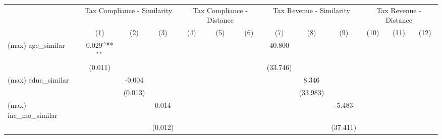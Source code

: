 {
\def\sym#1{\ifmmode^{#1}\else\(^{#1}\)\fi}
\begin{tabular}{l*{12}{c}}
\hline\hline
                &\multicolumn{3}{c}{Tax Compliance - Similarity}         &\multicolumn{3}{c}{Tax Compliance - Distance}           &\multicolumn{3}{c}{Tax Revenue - Similarity}            &\multicolumn{3}{c}{Tax Revenue - Distance}              \\
                &\multicolumn{1}{c}{(1)}         &\multicolumn{1}{c}{(2)}         &\multicolumn{1}{c}{(3)}         &\multicolumn{1}{c}{(4)}         &\multicolumn{1}{c}{(5)}         &\multicolumn{1}{c}{(6)}         &\multicolumn{1}{c}{(7)}         &\multicolumn{1}{c}{(8)}         &\multicolumn{1}{c}{(9)}         &\multicolumn{1}{c}{(10)}         &\multicolumn{1}{c}{(11)}         &\multicolumn{1}{c}{(12)}         \\
\hline
(max) age\_similar&    0.029\sym{**} &                  &                  &                  &                  &                  &   40.800         &                  &                  &                  &                  &                  \\
                &  (0.011)         &                  &                  &                  &                  &                  & (33.746)         &                  &                  &                  &                  &                  \\
(max) educ\_similar&                  &   -0.004         &                  &                  &                  &                  &                  &    8.346         &                  &                  &                  &                  \\
                &                  &  (0.013)         &                  &                  &                  &                  &                  & (33.983)         &                  &                  &                  &                  \\
(max) inc\_mo\_similar&                  &                  &    0.014         &                  &                  &                  &                  &                  &   -5.483         &                  &                  &                  \\
                &                  &                  &  (0.012)         &                  &                  &                  &                  &                  & (37.411)         &                  &                  &                  \\

\end{tabular}}
